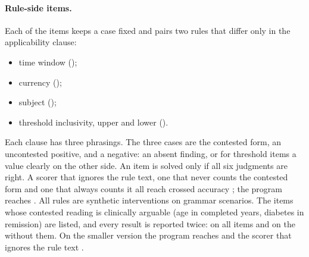 \paragraph{Rule-side items.}
Each of the  items keeps a case fixed and pairs two rules that differ only
in the applicability clause:
\begin{itemize}
\item time window ();
\item currency ();
\item subject ();
\item threshold inclusivity, upper and lower ().
\end{itemize}
Each clause has three phrasings. The three cases are the contested form, an uncontested positive, and a
negative: an absent finding, or for threshold items a value clearly on the other side. An item is solved
only if all six judgments are right. A scorer that ignores the rule text, one that never counts the
contested form and one that always counts it all reach crossed accuracy
; the program
reaches . All rules are synthetic
interventions on grammar scenarios. The  items whose contested
reading is clinically arguable (age in completed years, diabetes in remission) are listed, and every
result is reported twice: on all  items and on the
 without them. On the smaller version the program
reaches  and the scorer that ignores
the rule text .
